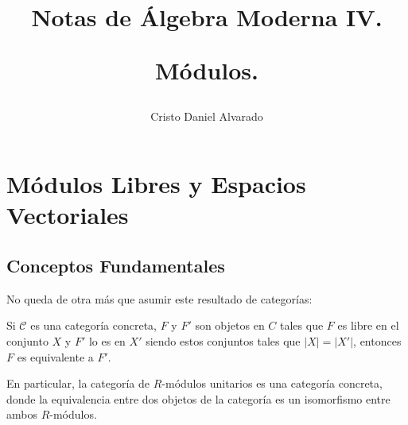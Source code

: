 \documentclass[12pt]{report}
\newcounter{it}
\theoremstyle{largebreak}
\newcommand\abs[1]{\ensuremath{\big|#1\big|}}
\begin{document}
    \setlength{\parskip}{5pt} %
    \setlength{\parindent}{12pt} %
    \title{Notas de Álgebra Moderna IV.
    
    Módulos.}
    \author{Cristo Daniel Alvarado}
    \maketitle

    \tableofcontents %


    \chapter{Módulos Libres y Espacios Vectoriales}

    \section{Conceptos Fundamentales}

    No queda de otra más que asumir este resultado de categorías:

    \begin{theor}
        Si $\mathcal{C}$ es una categoría concreta, $F$ y $F'$ son objetos en $C$ tales que $F$ es libre en el conjunto $X$ y $F'$ lo es en $X'$ siendo estos conjuntos tales que $\abs{X}=\abs{X'}$, entonces $F$ es equivalente a $F'$.
    \end{theor}

    En particular, la categoría de $R$-módulos unitarios es una categoría concreta, donde la equivalencia entre dos objetos de la categoría es un isomorfismo entre ambos $R$-módulos.
\end{document}
